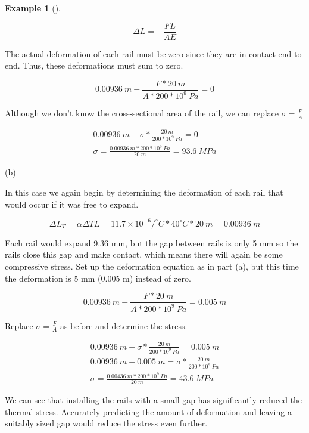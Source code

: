 \documentclass[
  letterpaper,
  DIV=11,
  numbers=noendperiod]{scrreprt}
\theoremstyle{definition}
\newtheorem{example}{Example}[chapter]
\theoremstyle{remark}
\begin{document}
\begin{tcolorbox}
\begin{example}[]
\begin{tcolorbox}
\[
\Delta L=-\frac{F L}{A E}
\]

The actual deformation of each rail must be zero since they are in
contact end-to-end. Thus, these deformations must sum to zero.

\[
0.00936{~m}-\frac{F * 20{~m}}{A * 200 * 10^9{~Pa}}=0
\]

Although we don't know the cross-sectional area of the rail, we can
replace \(\sigma=\frac{F}{A}\)

\[
\begin{gathered}
0.00936{~m}-\sigma * \frac{20{~m}}{200 * 10^9{~Pa}}=0 \\
\sigma=\frac{0.00936{~m} * 200 * 10^9{~Pa}}{20{~m}}=93.6{~MPa}
\end{gathered}
\]

(b)

In this case we again begin by determining the deformation of each rail
that would occur if it was free to expand.

\[
\Delta L_T=\alpha \Delta T L=11.7 \times 10^{-6}/^\circ{C} * 40^\circ{C} * 20{~m}=0.00936{~m}
\]

Each rail would expand 9.36 mm, but the gap between rails is only 5 mm
so the rails close this gap and make contact, which means there will
again be some compressive stress. Set up the deformation equation as in
part (a), but this time the deformation is 5 mm (0.005 m) instead of
zero.

\[
0.00936{~m}-\frac{F * 20{~m}}{A * 200 * 10^9{~Pa}}=0.005{~m}
\]

Replace \(\sigma=\frac{F}{A}\) as before and determine the stress.

\[
\begin{gathered}
0.00936{~m}-\sigma * \frac{20{~m}}{200 * 10^9{~Pa}}=0.005{~m} \\
0.00936{~m}-0.005{~m}=\sigma * \frac{20{~m}}{200 * 10^9{~Pa}} \\
\sigma=\frac{0.00436{~m} * 200 * 10^9{~Pa}}{20{~m}}=43.6{~MPa}
\end{gathered}
\]

We can see that installing the rails with a small gap has significantly
reduced the thermal stress. Accurately predicting the amount of
deformation and leaving a suitably sized gap would reduce the stress
even further.

\end{tcolorbox}

\end{example}

\end{tcolorbox}
\end{document}
